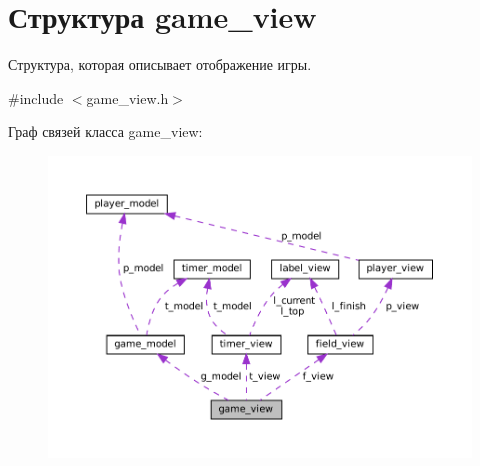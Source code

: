 \hypertarget{structgame__view}{}\section{Структура game\+\_\+view}
\label{structgame__view}


Структура, которая описывает отображение игры.  




{\ttfamily \#include $<$game\+\_\+view.\+h$>$}



Граф связей класса game\+\_\+view\+:\nopagebreak
\begin{figure}[H]
\begin{center}
\leavevmode
\includegraphics[width=350pt]{structgame__view__coll__graph}
\end{center}
\end{figure}
